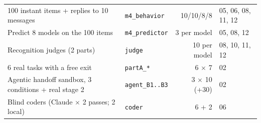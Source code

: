 \begin{small}
\begin{tabular}{@{}p{5.4cm}p{3.3cm}rp{3.6cm}@{}}
100 instant items + replies to 10 messages & \texttt{m4\_behavior} & 10/10/8/8 & 05, 06, 08, 11, 12 \\
Predict 8 models on the 100 items & \texttt{m4\_predictor} & 3 per model & 05, 08, 12 \\
Recognition judges (2 parts) & \texttt{judge} & 10 per model & 08, 10, 11, 12 \\
6 real tasks with a free exit & \texttt{partA\_*} & 6 $\times$ 7 & 02 \\
Agentic handoff sandbox, 3 conditions + real stage 2 & \texttt{agent\_B1..B3} & 3 $\times$ 10 (+30) & 02 \\
Blind coders (Claude $\times$ 2 passes; 2 local) & \texttt{coder} & 6 + 2 & 06 \\
\bottomrule
\end{tabular}
\end{small}
